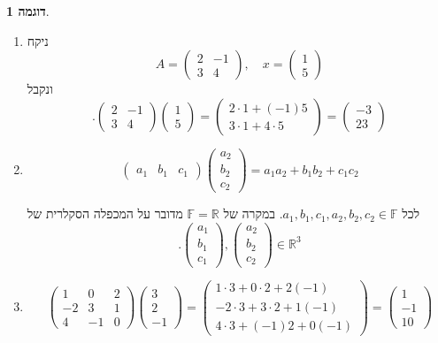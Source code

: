 \documentclass[12pt]{report}
\theoremstyle{plain}
\theoremstyle{definition}
\newtheorem{example}{דוגמה}[chapter]
\newcommand{\R}{\mathbb{R}}
\newcommand{\F}{\mathbb{F}}
\newcommand{\0}{\mathbf{0}}
\begin{document}
\begin{example}\
\begin{enumerate}[label=\alph*.]
\item
ניקח
$$
A = \begin{pmatrix}
2 & -1 \\
3 & 4
\end{pmatrix}, \quad 
x = \begin{pmatrix}
1 \\
5
\end{pmatrix}
$$
ונקבל
$$
.\begin{pmatrix}
2 & -1 \\
3 & 4
\end{pmatrix}
\begin{pmatrix}
1 \\
5
\end{pmatrix}
=
\begin{pmatrix}
2\cdot1 + (-1)5 \\
3\cdot1 + 4\cdot5
\end{pmatrix}
=
\begin{pmatrix}
-3 \\
23
\end{pmatrix}
$$


\item 
$$
\begin{pmatrix}a_1 &b_1 &c_1\end{pmatrix}\begin{pmatrix}a_2 \\ b_2 \\ c_2\end{pmatrix}=a_1a_2+b_1b_2+c_1c_2
$$

לכל 
$a_1,b_1,c_1,a_2,b_2,c_2\in\F$. 
במקרה של
$\F=\R$
מדובר על המכפלה הסקלרית של
$$
.\begin{pmatrix}a_1 \\ b_1 \\ c_1\end{pmatrix},\begin{pmatrix}a_2 \\ b_2 \\ c_2\end{pmatrix}\in\R^3
$$


\item 
$$
\begin{pmatrix}
1 & 0 & 2 \\
-2 & 3 & 1 \\
4 & -1 & 0
\end{pmatrix}
\begin{pmatrix}
3 \\
2 \\
-1
\end{pmatrix}
=
\begin{pmatrix}
1\cdot3 + 0\cdot2 + 2(-1) \\
-2\cdot3 + 3\cdot 2 + 1(-1) \\
4\cdot3 + (-1)2 + 0(-1)
\end{pmatrix}
=
\begin{pmatrix}
1 \\
-1 \\
10
\end{pmatrix}
$$


\end{enumerate}
\end{example}
\end{document}
